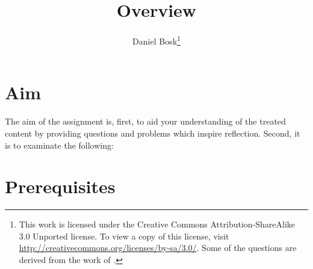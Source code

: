 \documentclass[a4paper,nocourse]{miunasgn}
\title{Overview}
\author{Daniel Bosk\footnote{%
	This work is licensed under the Creative Commons Attribution-ShareAlike 3.0 
	Unported license.
	To view a copy of this license, visit 
	\url{http://creativecommons.org/licenses/by-sa/3.0/}.
	Some of the questions are derived from the work of 
	\citeauthor*{Silberschatz2009osc}.
}}
\date{\svnId}
\begin{document}
\maketitle
\thispagestyle{foot}
\tableofcontents


\section{Aim}
\label{sec:Aim}
The aim of the assignment is, first, to aid your understanding of the treated 
content by providing questions and problems which inspire reflection.
Second, it is to examinate the following:
\begin{itemize}
	
\end{itemize}


\section{Prerequisites}
\label{sec:Prerequisites}

\end{document}

